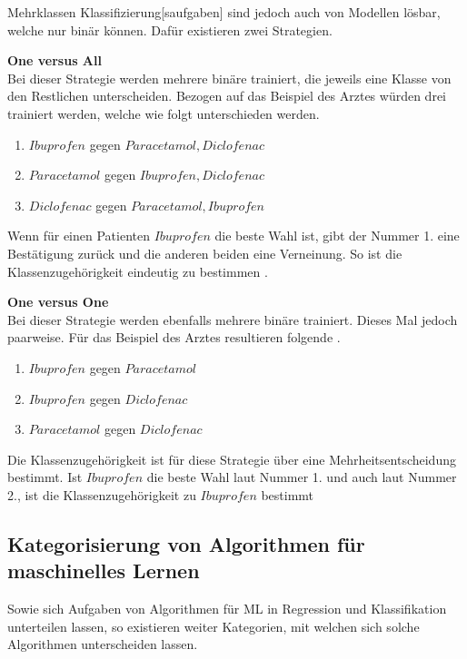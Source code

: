 \gls{Mehrklassen Klassifizierung}[saufgaben] sind jedoch auch von Modellen lösbar, welche nur binär  können. Dafür existieren zwei Strategien. \dubpar

\textbf{One versus All}\\
Bei dieser Strategie werden mehrere binäre  trainiert, die jeweils eine Klasse von den Restlichen unterscheiden. Bezogen auf das Beispiel des Arztes würden drei  trainiert werden, welche wie folgt unterschieden werden.

\begin{enumerate}
    \item \(Ibuprofen\) gegen \(Paracetamol, Diclofenac\)
    \item \(Paracetamol\) gegen \(Ibuprofen, Diclofenac\)
    \item \(Diclofenac\) gegen \(Paracetamol, Ibuprofen\)
\end{enumerate}

Wenn für einen Patienten \(Ibuprofen\) die beste Wahl ist, gibt der  Nummer 1. eine Bestätigung zurück und die anderen beiden  eine Verneinung. So ist die Klassenzugehörigkeit eindeutig zu bestimmen \cite{Bishop.2006, ShalevShwartz.2014}. \dubpar

\textbf{One versus One}\\
Bei dieser Strategie werden ebenfalls mehrere binäre  trainiert. Dieses Mal jedoch paarweise. Für das Beispiel des Arztes resultieren folgende .

 \begin{enumerate}
     \item \(Ibuprofen\) gegen \(Paracetamol\)
     \item \(Ibuprofen\) gegen \(Diclofenac\)
     \item \(Paracetamol\) gegen \(Diclofenac\)
 \end{enumerate}

 Die Klassenzugehörigkeit ist für diese Strategie über eine Mehrheitsentscheidung bestimmt. Ist \(Ibuprofen\) die beste Wahl laut  Nummer 1. und auch laut  Nummer 2., ist die Klassenzugehörigkeit zu \(Ibuprofen\) bestimmt


\subsection{Kategorisierung von Algorithmen für maschinelles Lernen}
Sowie sich Aufgaben von Algorithmen für \gls{ML} in Regression und \gls{Klassifikation} unterteilen lassen, so existieren weiter Kategorien, mit welchen sich solche Algorithmen unterscheiden lassen. \dubpar

